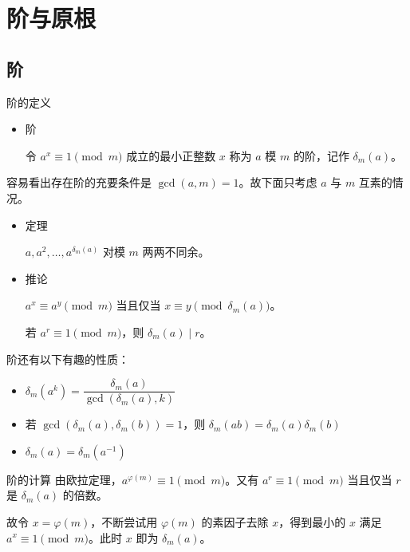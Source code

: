 \documentclass [hyperref={bookmarksdepth=4}, aspectratio=169] {beamer}
\theoremstyle {fy}
\begin{document}
\section{阶与原根}

\subsection{阶}

\begin{frame}{阶的定义}
\begin{itemize}
    \item 阶

  令 $a^x\equiv 1\pmod m$ 成立的最小正整数 $x$ 称为 $a$ 模 $m$ 的阶，记作 $\delta_m(a)$。
\end{itemize}

容易看出存在阶的充要条件是 $\gcd(a,m)=1$。故下面只考虑 $a$ 与 $m$ 互素的情况。

\begin{itemize}
    \item 定理

  $a,a^2,\dots,a^{\delta_m(a)}$ 对模 $m$ 两两不同余。

    \item 推论

  $a^x\equiv a^y\pmod m$ 当且仅当 $x\equiv y\pmod{\delta_m(a)}$。

  若 $a^r\equiv 1\pmod m$，则 $\delta_m(a)\mid r$。
\end{itemize}

阶还有以下有趣的性质：

\begin{itemize}
    \item $\delta_m(a^k)=\dfrac{\delta_m(a)}{\gcd(\delta_m(a),k)}$
    \item 若 $\gcd(\delta_m(a),\delta_m(b))=1$，则 $\delta_m(ab)=\delta_m(a)\delta_m(b)$
    \item $\delta_m(a)=\delta_m(a^{-1})$
\end{itemize}
\end{frame}

\begin{frame}{阶的计算}
由欧拉定理，$a^{\varphi(m)}\equiv1\pmod m$。又有 $a^r\equiv 1\pmod m$ 当且仅当 $r$ 是 $\delta_m(a)$ 的倍数。

故令 $x=\varphi(m)$，不断尝试用 $\varphi(m)$ 的素因子去除 $x$，得到最小的 $x$ 满足 $a^x\equiv 1\pmod m$。此时 $x$ 即为 $\delta_m(a)$。
\end{frame}
\end{document}
